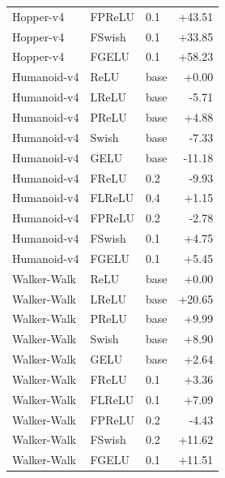 {\begin{longtable}{lllr}
Hopper-v4 & FPReLU & 0.1 & +43.51 \\
Hopper-v4 & FSwish & 0.1 & +33.85 \\
Hopper-v4 & FGELU & 0.1 & +58.23 \\
Humanoid-v4 & ReLU & base & +0.00 \\
Humanoid-v4 & LReLU & base & -5.71 \\
Humanoid-v4 & PReLU & base & +4.88 \\
Humanoid-v4 & Swish & base & -7.33 \\
Humanoid-v4 & GELU & base & -11.18 \\
Humanoid-v4 & FReLU & 0.2 & -9.93 \\
Humanoid-v4 & FLReLU & 0.4 & +1.15 \\
Humanoid-v4 & FPReLU & 0.2 & -2.78 \\
Humanoid-v4 & FSwish & 0.1 & +4.75 \\
Humanoid-v4 & FGELU & 0.1 & +5.45 \\
Walker-Walk & ReLU & base & +0.00 \\
Walker-Walk & LReLU & base & +20.65 \\
Walker-Walk & PReLU & base & +9.99 \\
Walker-Walk & Swish & base & +8.90 \\
Walker-Walk & GELU & base & +2.64 \\
Walker-Walk & FReLU & 0.1 & +3.36 \\
Walker-Walk & FLReLU & 0.1 & +7.09 \\
Walker-Walk & FPReLU & 0.2 & -4.43 \\
Walker-Walk & FSwish & 0.2 & +11.62 \\
Walker-Walk & FGELU & 0.1 & +11.51 \\
\end{longtable}
}
